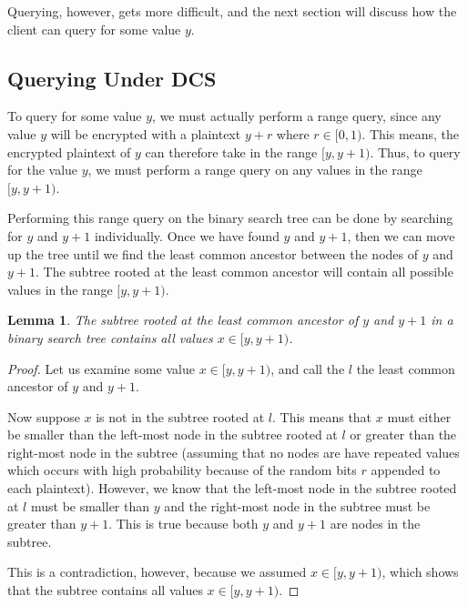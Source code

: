 \documentclass[12pt]{article}
\newtheorem{lemma}[theorem]{Lemma}
\begin{document}
\begin{figure}
\end{figure}

Querying, however, gets more difficult, and the next section will discuss how the client can query for some value $y$.

\subsection{Querying Under DCS}

  To query for some value $y$, we must actually perform a range query, since any value $y$ will be encrypted with a plaintext $y + r$ where $r \in [0,1)$. This means, the encrypted plaintext of $y$ can therefore take in the range $[y, y + 1)$. Thus, to query for the value $y$, we must perform a range query on any values in the range $[y, y+1)$.

  Performing this range query on the binary search tree can be done by searching for $y$ and $y+1$ individually. Once we have found $y$ and $y+1$, then we can move up the tree until we find the least common ancestor between the nodes of $y$ and $y+1$. The subtree rooted at the least common ancestor will contain all possible values in the range $[y, y+1)$.

  \begin{lemma}
    The subtree rooted at the least common ancestor of $y$ and $y+1$ in a binary search tree contains all values $x \in [y, y+1)$.
  \end{lemma}
  \begin{proof}
    Let us examine some value $x \in [y, y+1)$, and call the $l$ the least common ancestor of $y$ and $y+1$.

    Now suppose $x$ is not in the subtree rooted at $l$. This means that $x$ must either be smaller than the left-most node in the subtree rooted at $l$ or greater than the right-most node in the subtree (assuming that no nodes are have repeated values which occurs with high probability because of the random bits $r$ appended to each plaintext). However, we know that the left-most node in the subtree rooted at $l$ must be smaller than $y$ and the right-most node in the subtree must be greater than $y+1$. This is true because both $y$ and $y+1$ are nodes in the subtree.

    This is a contradiction, however, because we assumed $x \in [y, y+1)$, which shows that the subtree contains all values $x \in [y, y+1)$.
  \end{proof}
\end{document}

